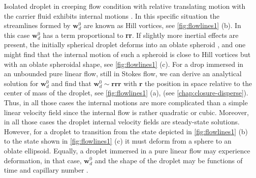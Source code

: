 Isolated droplet in creeping flow condition with relative translating motion with the carrier fluid exhibits internal motions \citet{pozrikidis1992boundary,kim2013microhydrodynamics}. 
In this specific situation the streamlines formed by $\textbf{w}_d^0$ are known as Hill vortices, see \ref{fig:flowlines1} (b).
In this case $\textbf{w}_d^0$ has a term proportional to \textbf{rr}.  
If slightly more inertial effects are present, the initially spherical droplet deforms into an oblate spheroid \citep{taylor1964deformation}, and one might find that the internal motion of such a spheroid is close to Hill vortices but with an oblate spheroidal shape, see \ref{fig:flowlines1} (c). 
For a drop immersed in an unbounded pure linear flow, still in Stokes flow, we can derive an analytical solution for $\textbf{w}_d^0$ and find that $\textbf{w}_d^0 \sim \textbf{rrr}$ with $\textbf{r}$ the position in space relative to the center of mass of the droplet, see \ref{fig:flowlines1} (a), (see \ref{chap:closure-disperse}). 
Thus, in all those cases the internal motions are more complicated than a simple linear velocity field since the internal flow is rather quadratic or cubic. 
Moreover, in all those cases the droplet internal velocity fields are steady-state solutions.
However, for a droplet to transition from the state depicted in \ref{fig:flowlines1} (b) to the state shown in \ref{fig:flowlines1} (c) it must deform from a sphere to an oblate ellipsoid. 
Equally, a droplet immersed in a pure linear flow may experience deformation, in that case, $\textbf{w}_d^0$ and the shape of the droplet may be functions of time and capillary number \citet[chapter 7]{leal2007advanced}.
